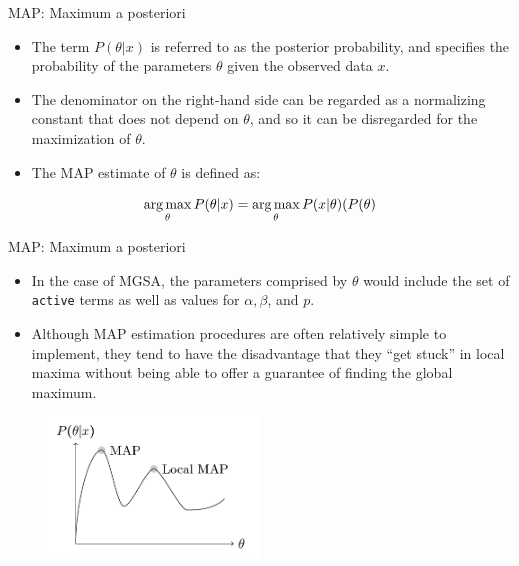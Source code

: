 \documentclass{beamer}
\newcommand{\argmax}{\operatornamewithlimits{arg\,max}}
\begin{document}
\begin{frame}{MAP: Maximum a posteriori}
 \begin{itemize}
  \item The term $P(\theta | x)$ is referred to as the posterior probability,
and specifies the probability of the parameters $\theta$ given the
observed data $x$. 
\item The denominator on the right-hand side can be
regarded as a normalizing constant that does not depend on $\theta$,
and so it can be disregarded for the maximization of $\theta$. 
\item The MAP
estimate of $\theta$ is defined as:
 \end{itemize}


\begin{equation}
\argmax_{\theta} P(\theta | x) = \argmax_{\theta} P(x|\theta )(P(\theta )
\label{eq:map}
\end{equation}
 
 
\end{frame}


\begin{frame}{MAP: Maximum a posteriori}
 \begin{itemize}
  \item  In the case of MGSA, the parameters comprised by $\theta$ would
include the set of \texttt{active} terms as well as values for
$\alpha,\beta$, and $p$. 

\item Although MAP estimation procedures are often relatively simple to
implement, they tend to have the disadvantage that they ``get stuck'' in
local maxima  without being
able to offer a guarantee of finding the global maximum.
 \end{itemize}

 \begin{figure}
 \centering
 \includegraphics[width=0.5\textwidth]{./img/MAP.png}
\end{figure}

 
\end{frame}
\end{document}
